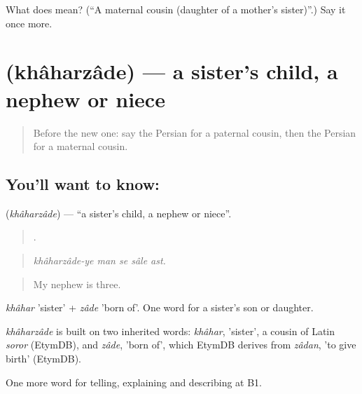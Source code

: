\begin{tcolorbox}[breakable,colback=teal!4,colframe=teal!35!black,title={Before you move on}]
What does  mean? (\textquotedblleft{}A maternal cousin (daughter of a mother's sister)\textquotedblright{}.) Say it once more.
\end{tcolorbox}
\section[\texorpdfstring{\fa{خواهرزاده} (khâharzâde)}{خواهرزاده (khâharzâde)}]{ (khâharzâde) — a sister's child, a nephew or niece}

\label{lesson:FA-C500-khaharzade}



\begin{quote}
Before the new one: say the Persian for a paternal cousin, then the Persian for a maternal cousin.
\end{quote}

\subsection*{You'll want to know: }
\textbf{} (\emph{khâharzâde}) — \textquotedblleft{}a sister's child, a nephew or niece\textquotedblright{}.

\begin{quote}
    .
\end{quote}

\begin{quote}
\emph{khâharzâde-ye man se sâle ast.}
\end{quote}

\begin{quote}
My nephew is three.
\end{quote}

\emph{khâhar} 'sister' + \emph{zâde} 'born of'. One word for a sister's son or daughter.

\begin{cousinweb}
\emph{khâharzâde} is built on two inherited words: \emph{khâhar}, 'sister', a cousin of Latin \emph{soror} (EtymDB), and \emph{zâde}, 'born of', which EtymDB derives from \emph{zâdan}, 'to give birth' (EtymDB).
\end{cousinweb}

\begin{grammarlens}[title={What you've built}]
One more word for telling, explaining and describing at B1.
\end{grammarlens}

